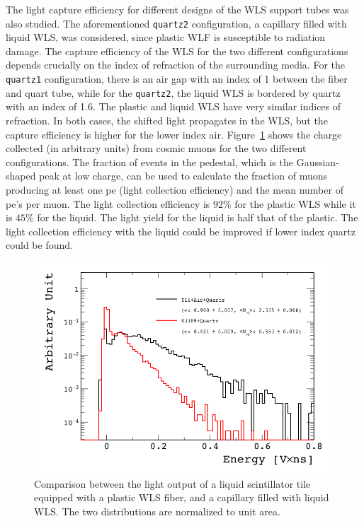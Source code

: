 \documentclass[review]{elsarticle}
\begin{document}
The light capture efficiency for different designs of the WLS support tubes was also studied.  The aforementioned \verb+quartz2+ configuration, a capillary filled with liquid WLS, was considered, since plastic WLF is susceptible to radiation damage.
The capture efficiency of the WLS for the two different configurations
depends crucially on the index of refraction 
of the surrounding media.  
For the \verb+quartz1+ configuration, there is an air gap with an index of 1 between the fiber and quart tube, while for the \verb+quartz2+, the liquid WLS is bordered by quartz with an index of 1.6.
The plastic and liquid WLS have very similar
indices of refraction.  In both cases, the shifted light propagates
in the WLS, but the capture efficiency is higher for the lower index air.
Figure~\ref{fig:y11_vs_cap} shows the charge collected (in arbitrary units)
from cosmic muons for the two different configurations.  The fraction of
events in the pedestal, which is the Gaussian-shaped peak at low charge,
can be used to calculate the fraction of muons producing at least one pe
(light collection efficiency)
and the mean number of pe's per muon.
The light collection efficiency
is  $92\%$ for the plastic WLS while it is  $45\%$ for the liquid.  The light
yield for the liquid is half that of the plastic.
The light collection efficiency with the liquid could be improved
if lower index quartz
could be found.

\begin{figure}[!ht]
\begin{center}
\includegraphics[width=0.98\textwidth]{./figures/list_RO_FIBER_all_norm.png}
\caption{Comparison between the light output of a liquid scintillator
  tile equipped with a plastic WLS fiber, and a capillary filled with
  liquid WLS. The two distributions are normalized to unit area.}
\label{fig:y11_vs_cap}
\end{center}
\end{figure}
\end{document}
